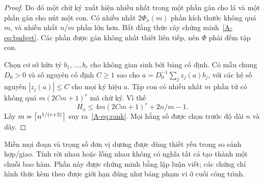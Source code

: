 \begin{proof}
Do đó một chữ ký xuất hiện nhiều nhất trong một phần gán cho lá và một phần gán cho nút một con. Có nhiều nhất $2\Phi_x(m)$ phần kích thước không quá $m$, và nhiều nhất $n/m$ phần lớn hơn. Bất đẳng thức cây chứng minh~\eqref{A-eq:budget}. Các phần được gán không nhất thiết liên tiếp, nên $\Phi$ phải đếm tập con.

Chọn cơ sở hữu tỷ $b_1,\ldots,b_r$ cho không gian sinh bởi bảng cố định. Có mẫu chung $D_0>0$ và số nguyên cố định $C\ge1$ sao cho $a=D_0^{-1}\sum_j z_j(a)b_j$, với các hệ số nguyên $|z_j(a)|\le C$ cho mọi ký hiệu $a$. Tập con có nhiều nhất $m$ phần tử có không quá $m(2Cm+1)^r$ mã chữ ký. Vì thế
\begin{equation}\label{A-eq:finite-rank}
H_x\le4m(2Cm+1)^r+2n/m-1.
\end{equation}
Lấy $m=\left\lceil n^{1/(r+2)}\right\rceil$ suy ra~\eqref{A-eq:rank}. Mọi hằng số được chọn trước độ dài $n$ và dãy.
\end{proof}

Miền mọi đoạn và trọng số đơn vị dương được dùng thiết yếu trong so sánh hợp/giao. Tính rời nhau hoặc lồng nhau không có nghĩa tất cả tạo thành một chuỗi bao hàm. Phần này được chứng minh bằng lập luận viết; các chứng chỉ hình thức kèm theo được giới hạn đúng như bảng phạm vi ở cuối công trình.

